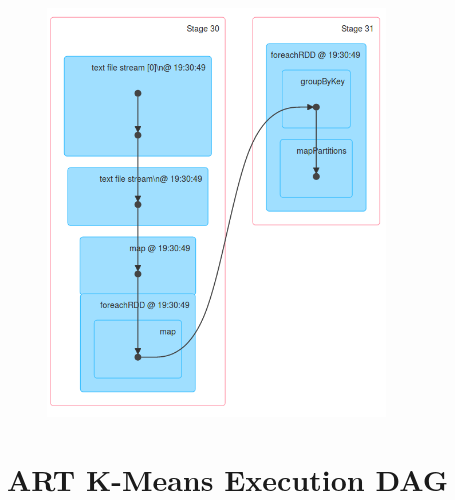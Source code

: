 \documentclass{l4proj}
\begin{document}
\begin{appendices}
\begin{figure}[H]
	\centering
    \includegraphics[width=0.80\textwidth]{images/DAG6}
    \label{fig:dag6}
\end{figure}

\section{ART K-Means Execution DAG}


\end{appendices}
\end{document}
